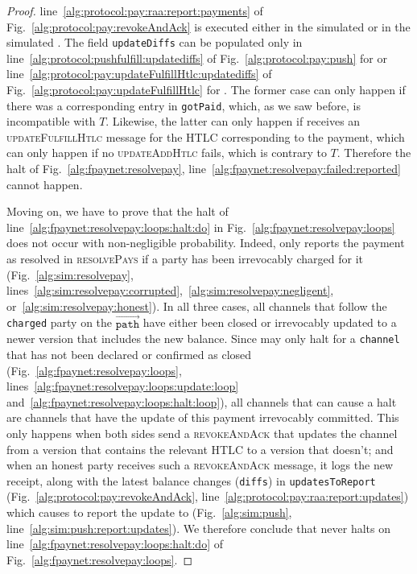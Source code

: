 \begin{proof}
  line~\ref{alg:protocol:pay:raa:report:payments} of
  Fig.~\ref{alg:protocol:pay:revokeAndAck} is executed either in the simulated
  \alice{} or in the simulated \bob. The field \texttt{updateDiffs} can be
  populated only in line~\ref{alg:protocol:pushfulfill:updatediffs} of
  Fig.~\ref{alg:protocol:pay:push} for \alice{} or
  line~\ref{alg:protocol:pay:updateFulfillHtlc:updatediffs} of
  Fig.~\ref{alg:protocol:pay:updateFulfillHtlc} for \bob. The former case can
  only happen if there was a corresponding entry in \texttt{gotPaid}, which, as
  we saw before, is incompatible with $T$. Likewise, the latter can only happen
  if \alice{} receives an \textsc{updateFulfillHtlc} message for the HTLC
  corresponding to the payment, which can only happen if no
  \textsc{updateAddHtlc} fails, which is contrary to $T$. Therefore the halt of
  Fig.~\ref{alg:fpaynet:resolvepay},
  line~\ref{alg:fpaynet:resolvepay:failed:reported} cannot happen.

  Moving on, we have to prove that the halt of
  line~\ref{alg:fpaynet:resolvepay:loops:halt:do} in
  Fig.~\ref{alg:fpaynet:resolvepay:loops} does not occur with non-negligible
  probability. Indeed, \simulator{} only reports the payment as resolved in
  \textsc{resolvePays} if a party has been irrevocably charged for it
  (Fig.~\ref{alg:sim:resolvepay},
  lines~\ref{alg:sim:resolvepay:corrupted},~\ref{alg:sim:resolvepay:negligent},
  or~\ref{alg:sim:resolvepay:honest}). In all three cases, all channels that
  follow the \texttt{charged} party on the $\overrightarrow{\mathtt{path}}$ have
  either been closed or irrevocably updated to a newer version that includes the
  new balance. Since \fpaynet{} may only halt for a \texttt{channel} that has
  not been declared or confirmed as closed
  (Fig.~\ref{alg:fpaynet:resolvepay:loops},
  lines~\ref{alg:fpaynet:resolvepay:loops:update:loop}
  and~\ref{alg:fpaynet:resolvepay:loops:halt:loop}), all channels that can cause
  a halt are channels that have the update of this payment irrevocably
  committed. This only happens when both sides send a \textsc{revokeAndAck} that
  updates the channel from a version that contains the relevant HTLC to a
  version that doesn't; and when an honest party receives such a
  \textsc{revokeAndAck} message, it logs the new receipt, along with the latest
  balance changes (\texttt{diffs}) in \texttt{updatesToReport}
  (Fig.~\ref{alg:protocol:pay:revokeAndAck},
  line~\ref{alg:protocol:pay:raa:report:updates}) which causes \simulator{} to
  report the update to \fpaynet{} (Fig.~\ref{alg:sim:push},
  line~\ref{alg:sim:push:report:updates}). We therefore conclude that \fpaynet{}
  never halts on line~\ref{alg:fpaynet:resolvepay:loops:halt:do} of
  Fig.~\ref{alg:fpaynet:resolvepay:loops}.


\end{proof}
